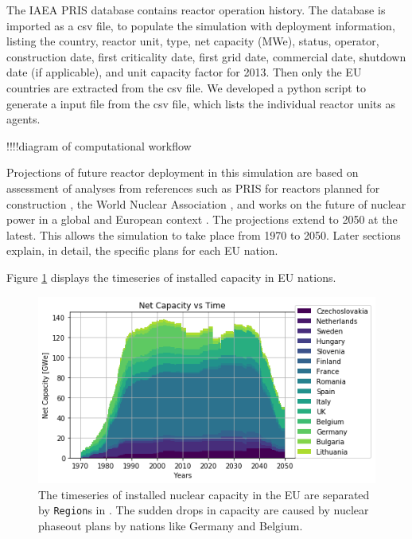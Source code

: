 The \gls{IAEA} \gls{PRIS} database \cite{iaea_nuclear_2017} contains reactor
operation history.
The database is imported as a csv file, to populate the simulation
with deployment information, listing the country, reactor unit, type, net capacity (MWe), status,
operator, construction date, first criticality date, first grid date, commercial date, shutdown
date (if applicable), and unit capacity factor for 2013. Then only the \gls{EU} countries are extracted
from the csv file. We developed a python script to generate a \Cyclus input file from the csv file,
which lists the individual reactor units as agents. 

!!!!diagram of computational workflow

Projections of future reactor deployment in this simulation are based on assessment of analyses
from references such as \gls{PRIS} for reactors planned for construction \cite{iaea_nuclear_2017},
the World Nuclear Association \cite{world_nuclear_association_nuclear_2017}, and works on the future of nuclear power in a global \cite{joskow_future_2012} and European context \cite{hatch_politics_2015}. 
The projections extend to 2050 at the latest. This allows the simulation to take place from
1970 to 2050. Later sections explain, in detail, the specific plans for each \gls{EU} nation.

Figure \ref{fig:eu_pow} displays the
timeseries of installed capacity in \gls{EU} nations.

\begin{figure}[htbp!]
	\begin{center}
		\includegraphics[scale=0.7]{./images/eu_future/power_plot.png}
	\end{center}
	\caption{The timeseries of installed nuclear capacity in the EU are separated by \texttt{Region}s in \Cyclus.
			 The sudden drops in capacity are caused by nuclear phaseout plans by nations like Germany and Belgium.
			 }
	\label{fig:eu_pow}
\end{figure}
\FloatBarrier

